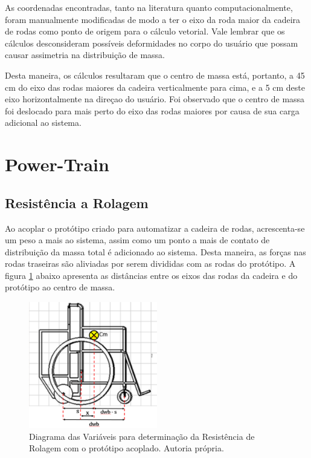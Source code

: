 As coordenadas encontradas, tanto na literatura quanto computacionalmente, foram manualmente modificadas de modo a ter o eixo da roda maior da cadeira de rodas como ponto de origem para o cálculo vetorial. Vale lembrar que os cálculos desconsideram possíveis deformidades no corpo do usuário que possam causar assimetria na distribuição de massa.

Desta maneira, os cálculos resultaram que o centro de massa está, portanto, a 45 cm do eixo das rodas maiores da cadeira verticalmente para cima, e a 5 cm deste eixo horizontalmente na direçao do usuário. Foi observado que o centro de massa foi deslocado para mais perto do eixo das rodas maiores por causa de sua carga adicional ao sistema.

\section{Power-Train}

\subsection[Resistência a Rolagem]{Resistência a Rolagem}

Ao acoplar o protótipo criado para automatizar a cadeira de rodas, acrescenta-se um peso a mais ao sistema, assim como um ponto a mais de contato de distribuição da massa total é adicionado ao sistema. Desta maneira, as forças nas rodas traseiras são aliviadas por serem divididas com as rodas do protótipo. A figura \ref{fig:finalmente_essa_imagem} abaixo apresenta as distâncias entre os eixos das rodas da cadeira e do protótipo ao centro de massa.

\begin{figure}[!htb]
	\centering
	\includegraphics[width = 0.5\textwidth]{figuras/resultados/finalmente_essa_imagem}
	\caption{Diagrama das Variáveis para determinação da Resistência de Rolagem com o protótipo acoplado. Autoria própria.}
	\label{fig:finalmente_essa_imagem}
\end{figure}

